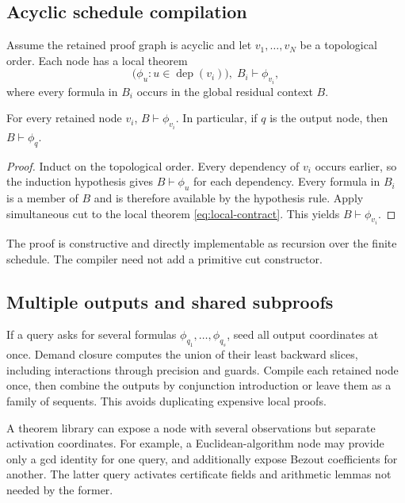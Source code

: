 \subsection{Acyclic schedule compilation}

Assume the retained proof graph is acyclic and let
\(v_1,\ldots,v_N\) be a topological order.  Each node has a local theorem
\[
  \bigl(\phi_u:u\in\operatorname{dep}(v_i)\bigr),\;B_i
  \vdash \phi_{v_i},
  \tag{7.1}\label{eq:local-contract}
\]
where every formula in \(B_i\) occurs in the global residual context \(B\).

\begin{theorem}
\label{thm:acyclic-compile}
For every retained node \(v_i\), \(B\vdash\phi_{v_i}\).  In particular, if
\(q\) is the output node, then \(B\vdash\phi_q\).
\end{theorem}

\begin{proof}
Induct on the topological order.  Every dependency of \(v_i\) occurs earlier,
so the induction hypothesis gives \(B\vdash\phi_u\) for each dependency.
Every formula in \(B_i\) is a member of \(B\) and is therefore available by
the hypothesis rule.  Apply simultaneous cut to the local theorem
\eqref{eq:local-contract}.  This yields \(B\vdash\phi_{v_i}\).
\end{proof}

The proof is constructive and directly implementable as recursion over the
finite schedule.  The compiler need not add a primitive cut constructor.

\subsection{Multiple outputs and shared subproofs}

If a query asks for several formulas \(\phi_{q_1},\ldots,\phi_{q_s}\), seed all
output coordinates at once.  Demand closure computes the union of their least
backward slices, including interactions through precision and guards.  Compile
each retained node once, then combine the outputs by conjunction introduction
or leave them as a family of sequents.  This avoids duplicating expensive local
proofs.

A theorem library can expose a node with several observations but separate
activation coordinates.  For example, a Euclidean-algorithm node may provide
only a gcd identity for one query, and additionally expose Bezout coefficients
for another.  The latter query activates certificate fields and arithmetic
lemmas not needed by the former.

